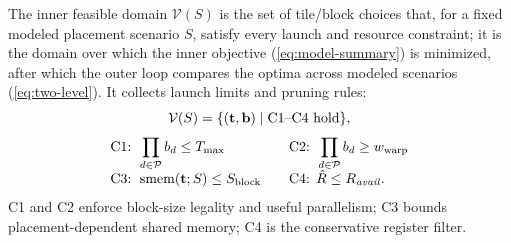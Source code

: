 \documentclass[acmsmall,review,anonymous,screen]{acmart}
\newcommand{\tvec}{\mathbf{t}}
\newcommand{\Sblock}{S_{\mathrm{block}}}
\newcommand{\Tmax}{T_{\max}}
\newcommand{\Wwarp}{w_{\mathrm{warp}}}
\begin{document}
The inner feasible domain \(\mathcal{V}(S)\) is the set of tile/block choices that, for a fixed modeled placement scenario \(S\), satisfy every launch and resource constraint; it is the domain over which the inner objective (\autoref{eq:model-summary}) is minimized, after which the outer loop compares the optima across modeled scenarios (\autoref{eq:two-level}). It collects launch limits and pruning rules:
\begin{equation}
\begin{gathered}
\mathcal{V}(S)
= \{(\tvec,\mathbf{b}) \mid \text{C1--C4 hold}\},\\[0.6ex]
\begin{array}{@{}l@{\qquad}l@{}}
\text{C1: } \displaystyle \prod_{d\in\mathcal{P}} b_d \le \Tmax
&
\text{C2: } \displaystyle \prod_{d\in\mathcal{P}} b_d \ge \Wwarp\\[0.7ex]
\text{C3: } \operatorname{smem}(\tvec;S)\le \Sblock
&
\text{C4: } \hat{R}\le R_{\mathit{avail}}.
\end{array}
\end{gathered}
\label{eq:feasible-domain}
\end{equation}
C1 and C2 enforce block-size legality and useful parallelism; C3 bounds placement-dependent shared memory; C4 is the conservative register filter.
\end{document}
